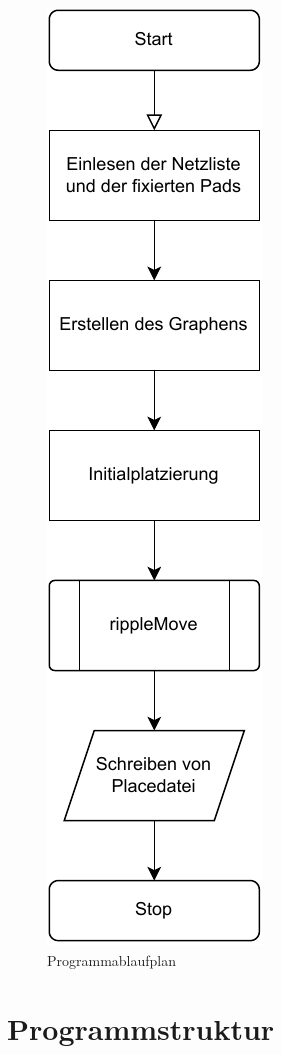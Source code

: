     \begin{figure}[H]
        \centering
        \includegraphics[scale=0.75]{img/Programm-flowchart.pdf}
        \caption{Programmablaufplan}
        \label{fig:program-flowchart}
    \end{figure}

        

    \section{Programmstruktur}

